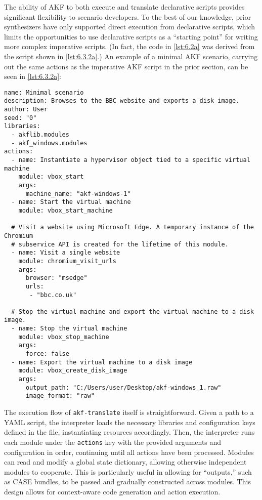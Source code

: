 The ability of AKF to both execute and translate declarative scripts
provides significant flexibility to scenario developers. To the best of
our knowledge, prior synthesizers have only supported direct execution
from declarative scripts, which limits the opportunities to use
declarative scripts as a ``starting point'' for writing more complex
imperative scripts. (In fact, the code in \autoref{lst:6.2a} was derived
from the script shown in \autoref{lst:6.3.2a}.) An example of a minimal
AKF scenario, carrying out the same actions as the imperative AKF script
in the prior section, can be seen in \autoref{lst:6.3.2a}:

\begin{lstlisting}[label={lst:6.3.2a}, caption={Example of a declarative AKF scenario.}, ]
name: Minimal scenario
description: Browses to the BBC website and exports a disk image.
author: User
seed: "0"
libraries:
  - akflib.modules
  - akf_windows.modules
actions:
  - name: Instantiate a hypervisor object tied to a specific virtual machine
    module: vbox_start
    args:
      machine_name: "akf-windows-1"
  - name: Start the virtual machine
    module: vbox_start_machine

  # Visit a website using Microsoft Edge. A temporary instance of the Chromium
  # subservice API is created for the lifetime of this module.
  - name: Visit a single website
    module: chromium_visit_urls
    args:
      browser: "msedge"
      urls: 
       - "bbc.co.uk"

  # Stop the virtual machine and export the virtual machine to a disk image.
  - name: Stop the virtual machine
    module: vbox_stop_machine
    args:
      force: false
  - name: Export the virtual machine to a disk image
    module: vbox_create_disk_image
    args:
      output_path: "C:/Users/user/Desktop/akf-windows_1.raw"
      image_format: "raw"
\end{lstlisting}

The execution flow of \passthrough{\lstinline!akf-translate!} itself is
straightforward. Given a path to a YAML script, the interpreter loads
the necessary libraries and configuration keys defined in the file,
instantiating resources accordingly. Then, the interpreter runs each
module under the \passthrough{\lstinline!actions!} key with the provided
arguments and configuration in order, continuing until all actions have
been processed. Modules can read and modify a global state dictionary,
allowing otherwise independent modules to cooperate. This is
particularly useful in allowing for ``outputs,'' such as CASE bundles,
to be passed and gradually constructed across modules. This design
allows for context-aware code generation and action execution.

